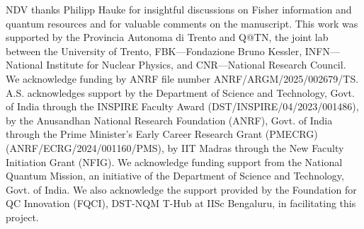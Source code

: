 \documentclass[amsmath,nobibnotes,aps,amssymb,pra, prl,aps,showpacs,superscriptaddress,twocolumn, longbibliography, reprint]{revtex4-2}
\begin{document}
\begin{acknowledgments}


NDV thanks Philipp Hauke for insightful discussions on Fisher information and quantum resources and for valuable comments on the manuscript. This work was supported by the Provincia Autonoma di Trento and Q@TN, the joint lab between the University of Trento, FBK—Fondazione Bruno Kessler, INFN—National Institute for Nuclear Physics, and CNR—National Research Council. We acknowledge funding by ANRF file number ANRF/ARGM/2025/002679/TS. A.S. acknowledges support by the Department of Science and Technology, Govt. of India through the INSPIRE Faculty Award (DST/INSPIRE/04/2023/001486), by the Anusandhan National Research Foundation (ANRF), Govt. of India through the Prime Minister’s Early Career Research Grant (PMECRG) (ANRF/ECRG/2024/001160/PMS), by IIT Madras through the New Faculty Initiation Grant (NFIG). We acknowledge funding support from the National Quantum Mission, an
initiative of the Department of Science and Technology, Govt. of
India.
We also acknowledge the support provided by the Foundation for QC
Innovation (FQCI), DST-NQM T-Hub at IISc Bengaluru, in facilitating
this project.


\end{acknowledgments}

%

\onecolumngrid
\appendix
\end{document}
